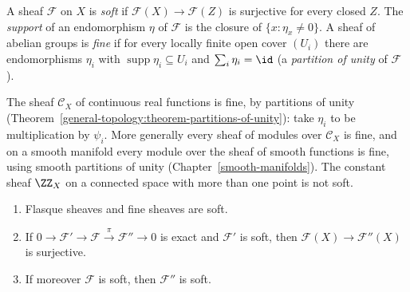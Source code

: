 \begin{definition}\label{sheaves:definition-soft-fine}
A sheaf $\mathcal{F}$ on $X$ is \emph{soft} if $\mathcal{F}(X) \to \mathcal{F}(Z)$ is surjective for every closed $Z$. The \emph{support} of an endomorphism $\eta$ of $\mathcal{F}$ is the
closure of $\{x : \eta_x \neq 0\}$. A sheaf of abelian groups is \emph{fine} if for every locally finite open cover $(U_i)$ there are endomorphisms $\eta_i$ with
$\operatorname{supp}\eta_i \subseteq U_i$ and $\sum_i\eta_i = \id$ (a \emph{partition of unity} of $\mathcal{F}$).
\end{definition}

\begin{example}\label{sheaves:example-fine}
The sheaf $\mathcal{C}_X$ of continuous real functions is fine, by partitions of unity (Theorem~\ref{general-topology:theorem-partitions-of-unity}): take $\eta_i$ to be
multiplication by $\psi_i$. More generally every sheaf of modules over $\mathcal{C}_X$ is fine, and on a smooth manifold every module over the sheaf of smooth functions is fine,
using smooth partitions of unity (Chapter~\ref{smooth-manifolds}). The constant sheaf $\ZZ_X$ on a connected space with more than one point is not soft.
\end{example}

\begin{lemma}\label{sheaves:lemma-soft-properties}
\begin{enumerate}
\item Flasque sheaves and fine sheaves are soft.
\item If $0 \to \mathcal{F}' \to \mathcal{F} \xrightarrow{\pi} \mathcal{F}'' \to 0$ is exact and $\mathcal{F}'$ is soft, then $\mathcal{F}(X) \to \mathcal{F}''(X)$ is surjective.
\item If moreover $\mathcal{F}$ is soft, then $\mathcal{F}''$ is soft.
\end{enumerate}
\end{lemma}

